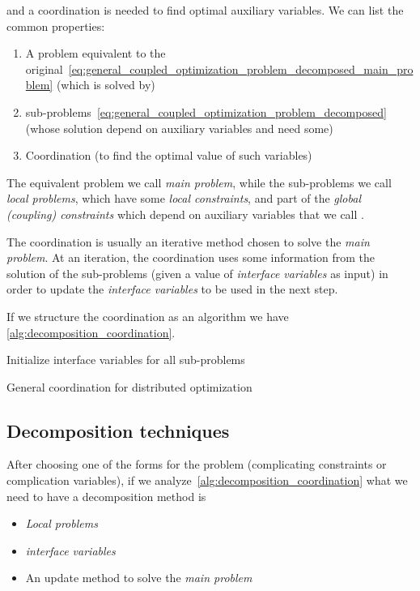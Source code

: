 \documentclass[../main.tex]{subfiles}
\begin{document}
and a coordination is needed to find optimal auxiliary variables. We can list the common properties:
\begin{enumerate}
  \item A problem equivalent to the original~\eqref{eq:general_coupled_optimization_problem_decomposed_main_problem} (which is solved by)
  \item sub-problems~\eqref{eq:general_coupled_optimization_problem_decomposed} (whose solution depend on auxiliary variables and need some)
  \item Coordination (to find the optimal value of such variables)
\end{enumerate}

The equivalent problem we call \emph{main problem}, while the sub-problems we call \emph{local problems}, which have some \emph{local constraints}, and part of the \emph{global (coupling) constraints} which depend on auxiliary variables that we call \emph{}.

The coordination is usually an iterative method chosen to solve the \emph{main problem}.
At an iteration, the coordination uses some information from the solution of the sub-problems (given a value of \emph{interface variables} as input) in order to update the \emph{interface variables} to be used in the next step.

If we structure the coordination as an algorithm we have \autoref{alg:decomposition_coordination}.

\begin{algorithm2e}[H]
  \DontPrintSemicolon%
  Initialize interface variables for all sub-problems\;
  \caption{General coordination for distributed optimization}\label{alg:decomposition_coordination}
\end{algorithm2e}

\subsection{Decomposition techniques}

After choosing one of the forms for the problem (complicating constraints or complication variables), if we analyze \autoref{alg:decomposition_coordination} what we need to have a decomposition method is
\begin{itemize}
  \item \emph{Local problems}
  \item \emph{interface variables}
  \item An update method to solve the \emph{main problem}
\end{itemize}
\end{document}
